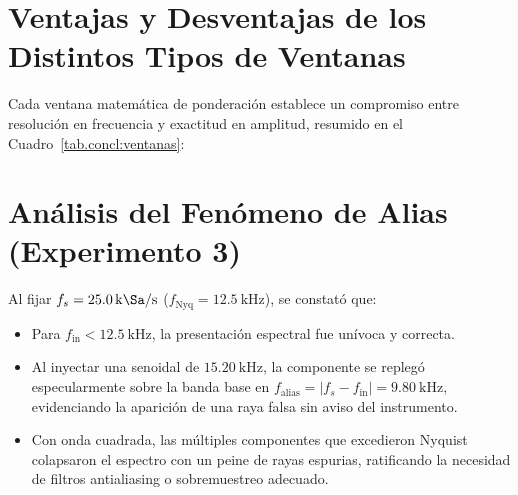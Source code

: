 \section{Ventajas y Desventajas de los Distintos Tipos de Ventanas}
Cada ventana matemática de ponderación establece un compromiso entre resolución en frecuencia y exactitud en amplitud,
resumido en el Cuadro~\ref{tab.concl:ventanas}:

\begin{table}[!ht]
    \centering
    \caption{Comparación de ventajas y aplicaciones de las ventanas Rectangular, Hanning y Flattop.}
    \label{tab.concl:ventanas}
\end{table}

\section{Análisis del Fenómeno de Alias (Experimento 3)}
Al fijar $f_s = \qty{25.0}{\kilo\Sa\per\second}$ ($f_{\text{Nyq}} = \qty{12.5}{\kilo\hertz}$), se constató que:
\begin{itemize}[noitemsep, topsep=2pt]
    \item Para $f_{\text{in}} < \qty{12.5}{\kilo\hertz}$, la presentación espectral fue unívoca y correcta.
    \item Al inyectar una senoidal de $\qty{15.20}{\kilo\hertz}$, la componente se replegó especularmente sobre la banda base en $f_{\text{alias}} = |f_s - f_{\text{in}}| = \qty{9.80}{\kilo\hertz}$, evidenciando la aparición de una raya falsa sin aviso del instrumento.
    \item Con onda cuadrada, las múltiples componentes que excedieron Nyquist colapsaron el espectro con un peine de rayas espurias, ratificando la necesidad de filtros antialiasing o sobremuestreo adecuado.
\end{itemize}

